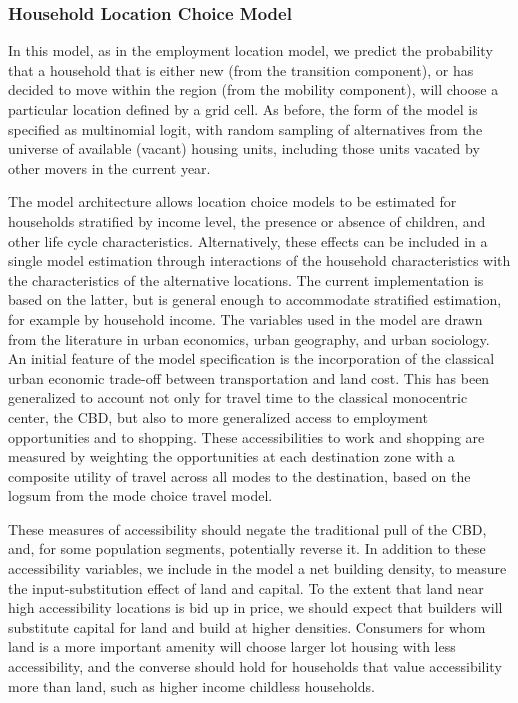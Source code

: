 \documentclass[fleqn]{article}
\begin{document}

\subsubsection{Household Location Choice Model}

In this model, as in the employment location model, we predict the
probability that a household that is either new (from the
transition component), or has decided to move within the region
(from the mobility component), will choose a particular location
defined by a grid cell.  As before, the form of the model is
specified as multinomial logit, with random sampling of
alternatives from the universe of available (vacant) housing
units, including those units vacated by other movers in the current
year.

The model architecture allows location choice models to be
estimated for households stratified by income level, the presence
or absence of children, and other life cycle characteristics.
Alternatively, these effects can be included in a single model
estimation through interactions of the household characteristics
with the characteristics of the alternative locations.  The
current implementation is based on the latter, but is general
enough to accommodate stratified estimation, for example by
household income. The variables used in the model are drawn from
the literature in urban economics, urban geography, and urban
sociology.  An initial feature of the model specification is the
incorporation of the classical urban economic trade-off between
transportation and land cost. This has been generalized to account
not only for travel time to the classical monocentric center, the
CBD, but also to more generalized access to employment
opportunities and to shopping. These accessibilities to work and
shopping are measured by weighting the opportunities at each
destination zone with a composite utility of travel across all
modes to the destination, based on the logsum from the mode choice
travel model.

These measures of accessibility should negate the traditional pull
of the CBD, and, for some population segments, potentially reverse
it.  In addition to these accessibility variables, we include in
the model a net building density, to measure the
input-substitution effect of land and capital.  To the extent that
land near high accessibility locations is bid up in price, we
should expect that builders will substitute capital for land and
build at higher densities.  Consumers for whom land is a more
important amenity will choose larger lot housing with less
accessibility, and the converse should hold for households that
value accessibility more than land, such as higher income
childless households.
\end{document}
